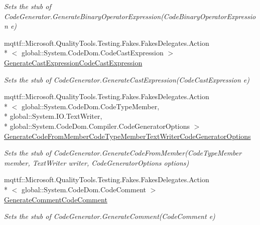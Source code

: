 \begin{DoxyCompactItemize}
\begin{DoxyCompactList}\small\item\em Sets the stub of Code\-Generator.\-Generate\-Binary\-Operator\-Expression(\-Code\-Binary\-Operator\-Expression e)\end{DoxyCompactList}\item 
mqttf\-::\-Microsoft.\-Quality\-Tools.\-Testing.\-Fakes.\-Fakes\-Delegates.\-Action\\*
$<$ global\-::\-System.\-Code\-Dom.\-Code\-Cast\-Expression $>$ \hyperlink{class_system_1_1_code_dom_1_1_compiler_1_1_fakes_1_1_stub_code_generator_aeb36a8bc87f093d4620ff37c8cff5a4f}{Generate\-Cast\-Expression\-Code\-Cast\-Expression}
\begin{DoxyCompactList}\small\item\em Sets the stub of Code\-Generator.\-Generate\-Cast\-Expression(\-Code\-Cast\-Expression e)\end{DoxyCompactList}\item 
mqttf\-::\-Microsoft.\-Quality\-Tools.\-Testing.\-Fakes.\-Fakes\-Delegates.\-Action\\*
$<$ global\-::\-System.\-Code\-Dom.\-Code\-Type\-Member, \\*
global\-::\-System.\-I\-O.\-Text\-Writer, \\*
global\-::\-System.\-Code\-Dom.\-Compiler.\-Code\-Generator\-Options $>$ \hyperlink{class_system_1_1_code_dom_1_1_compiler_1_1_fakes_1_1_stub_code_generator_af071576d31bf1a1fc0a149f4a4cbb4fe}{Generate\-Code\-From\-Member\-Code\-Type\-Member\-Text\-Writer\-Code\-Generator\-Options}
\begin{DoxyCompactList}\small\item\em Sets the stub of Code\-Generator.\-Generate\-Code\-From\-Member(\-Code\-Type\-Member member, Text\-Writer writer, Code\-Generator\-Options options)\end{DoxyCompactList}\item 
mqttf\-::\-Microsoft.\-Quality\-Tools.\-Testing.\-Fakes.\-Fakes\-Delegates.\-Action\\*
$<$ global\-::\-System.\-Code\-Dom.\-Code\-Comment $>$ \hyperlink{class_system_1_1_code_dom_1_1_compiler_1_1_fakes_1_1_stub_code_generator_ab94e3d065682eb64fd8f7bf7a6c99d4c}{Generate\-Comment\-Code\-Comment}
\begin{DoxyCompactList}\small\item\em Sets the stub of Code\-Generator.\-Generate\-Comment(\-Code\-Comment e)\end{DoxyCompactList}\item 

\end{DoxyCompactItemize}
